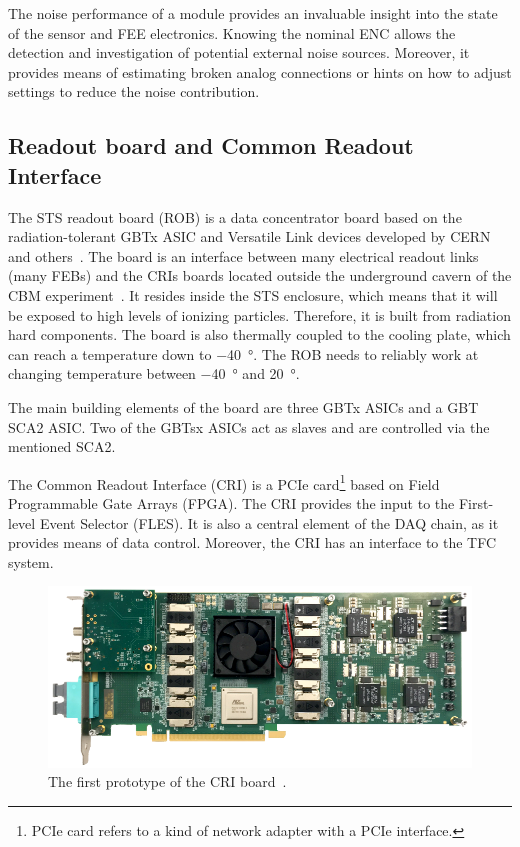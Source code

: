 The noise performance of a module provides an invaluable insight into the state of the sensor and \gls{FEE} electronics. Knowing the nominal \gls{ENC} allows the detection and investigation of potential external noise sources. Moreover, it provides means of estimating broken analog connections or hints on how to adjust settings to reduce the noise contribution.
\subsection{Readout board and Common Readout Interface}

The \gls{STS} readout board (\gls{ROB}) is a data concentrator board based on the radiation-tolerant GBTx ASIC and Versatile Link
devices developed by CERN and others~\cite{Bonacini:1235849, C_2013}. The board is an interface between many electrical readout links (many \glspl{FEB}) and the \glspl{CRI} boards located outside the underground cavern of the \gls{CBM} experiment~\cite{Lehnert_2017}. It resides inside the \gls{STS} enclosure, which means that it will be exposed to high levels of ionizing particles. Therefore, it is built from radiation hard components. The board is also thermally coupled to the cooling plate, which can reach a temperature down to \SI{-40}{\degree}. The \gls{ROB} needs to reliably work at changing temperature between \SI{-40}{\degree} and \SI{20}{\degree}. 

The main building elements of the board are three \gls{GBT}x \glspl{ASIC} and a \gls{GBT} \gls{SCA2} \gls{ASIC}. Two of the \glspl{GBT}x \glspl{ASIC} act as slaves and are controlled via the mentioned \gls{SCA2}. 

The Common Readout Interface (\gls{CRI}) is a PCIe card\footnote{PCIe card refers to a kind of network adapter with a PCIe interface.} based on Field Programmable Gate Arrays (\gls{FPGA}). The \gls{CRI} provides the input to the First-level Event Selector (\gls{FLES}). It is also a central element of the \gls{DAQ} chain, as it provides means of data control. Moreover, the \gls{CRI} has an interface to the \gls{TFC} system. 
\begin{figure}[!h]
\centering
\includegraphics[width=0.8\columnwidth]{Chapter2/images/cri_board_atlas.pdf}
\caption{The first prototype of the \gls{CRI} board~\cite{CRI}.}
\label{fig_cri_board}
\end{figure}


